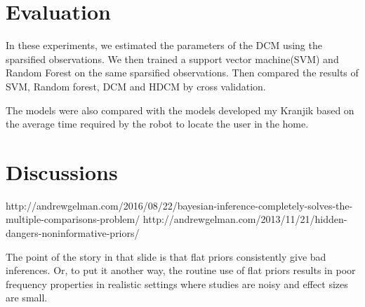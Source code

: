 \FloatBarrier

\section{Evaluation}

In these experiments, we estimated the parameters of the DCM using the sparsified observations. We then trained a support vector machine(SVM) and Random Forest on the same sparsified observations. Then compared the results of SVM, Random forest, DCM and HDCM by cross validation.




The models were also compared with the models developed my Kranjik  based on the average time required by the robot to locate the user in the home.





\section{Discussions}

http://andrewgelman.com/2016/08/22/bayesian-inference-completely-solves-the-multiple-comparisons-problem/
http://andrewgelman.com/2013/11/21/hidden-dangers-noninformative-priors/

The point of the story in that slide is that flat priors consistently give bad inferences. Or, to put it another way, the routine use of flat priors results in poor frequency properties in realistic settings where studies are noisy and effect sizes are small.
\label{sec:}




